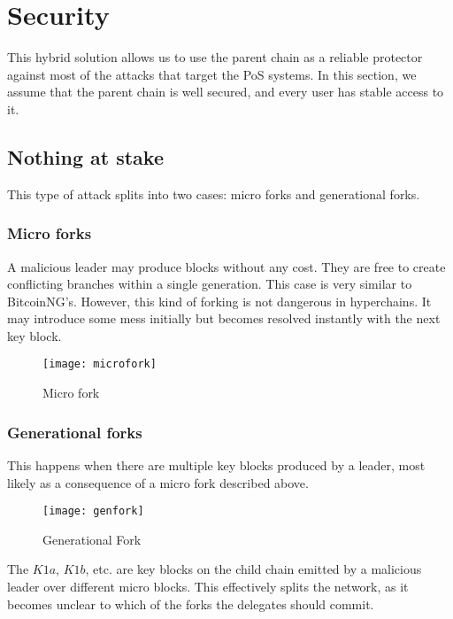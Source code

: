 \section{Security}

This hybrid solution allows us to use the parent chain as a reliable protector
against most of the attacks that target the PoS systems\cite{pos_attacks}. In
this section, we assume that the parent chain is well secured, and every user
has stable access to it.

\subsection{Nothing at stake}

This type of attack splits into two cases: micro forks and generational forks.

\subsubsection{Micro forks}

A malicious leader may produce blocks without any cost. They are free to create
conflicting branches within a single generation. This case is very similar to
BitcoinNG's\cite{bcng}. However, this kind of forking is not dangerous in
hyperchains. It may introduce some mess initially but becomes resolved instantly
with the next key block.

\begin{figure}[h]
	\caption{Micro fork}
	\centering
	\texttt{[image: microfork]}
\end{figure}

\subsubsection{Generational forks}

This happens when there are multiple key blocks produced by a leader, most
likely as a consequence of a micro fork described above.

\begin{figure}[h]
	\caption{Generational Fork}
	\centering
	\texttt{[image: genfork]}
\end{figure}

The $K1a$, $K1b$, etc. are key blocks on the child chain emitted by a malicious
leader over different micro blocks. This effectively splits the network, as it
becomes unclear to which of the forks the delegates should commit.

